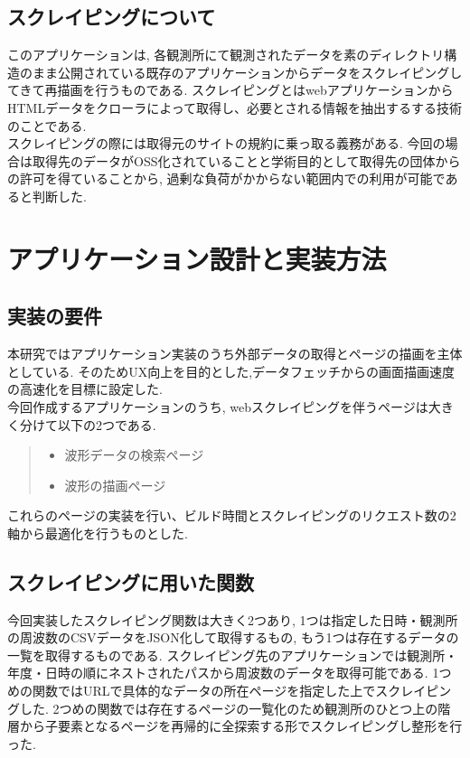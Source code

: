 \subsection{スクレイピングについて}
このアプリケーションは, 各観測所にて観測されたデータを素のディレクトリ構造のまま公開されている既存のアプリケーションからデータをスクレイピングしてきて再描画を行うものである.
スクレイピングとはwebアプリケーションからHTMLデータをクローラによって取得し、必要とされる情報を抽出するする技術のことである.\\
スクレイピングの際には取得元のサイトの規約に乗っ取る義務がある.
今回の場合は取得先のデータがOSS化されていることと学術目的として取得先の団体からの許可を得ていることから, 過剰な負荷がかからない範囲内での利用が可能であると判断した.

\section{アプリケーション設計と実装方法}
\subsection{実装の要件}
本研究ではアプリケーション実装のうち外部データの取得とページの描画を主体としている.
そのためUX向上を目的とした,データフェッチからの画面描画速度の高速化を目標に設定した.\\
今回作成するアプリケーションのうち, webスクレイピングを伴うページは大きく分けて以下の2つである.\\
\begin{quote}
	\begin{itemize}
		\item 波形データの検索ページ
		\item 波形の描画ページ
	\end{itemize}
\end{quote}
これらのページの実装を行い、ビルド時間とスクレイピングのリクエスト数の2軸から最適化を行うものとした.

\subsection{スクレイピングに用いた関数}
今回実装したスクレイピング関数は大きく2つあり, 1つは指定した日時・観測所の周波数のCSVデータをJSON化して取得するもの, もう1つは存在するデータの一覧を取得するものである.
スクレイピング先のアプリケーションでは観測所・年度・日時の順にネストされたパスから周波数のデータを取得可能である. 
1つめの関数ではURLで具体的なデータの所在ページを指定した上でスクレイピングした.
2つめの関数では存在するページの一覧化のため観測所のひとつ上の階層から子要素となるページを再帰的に全探索する形でスクレイピングし整形を行った.

